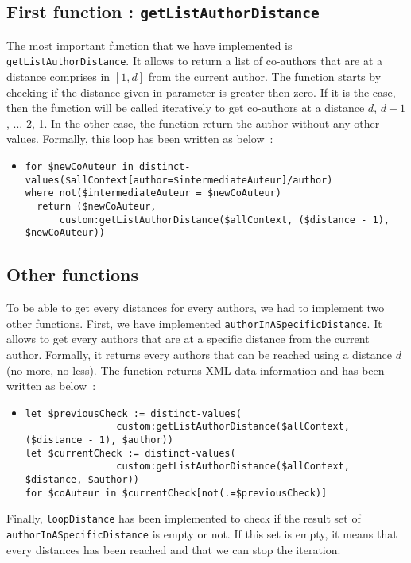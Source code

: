 \documentclass{article}
\begin{document}
  \subsection{First function : \texttt{getListAuthorDistance}}
  The most important function that we have implemented is \verb|getListAuthorDistance|. It allows to return a list of co-authors that are at a distance comprises in $[1,d]$ from the current author. The function starts by checking if the distance given in parameter is greater then zero. If it is the case, then the function will be called iteratively to get co-authors at a distance $d$, $d-1$, ... 2, 1. In the other case, the function return the author without any other values. Formally, this loop has been written as below~:
    \begin{itemize}
      \item \begin{verbatim}
for $newCoAuteur in distinct-values($allContext[author=$intermediateAuteur]/author)
where not($intermediateAuteur = $newCoAuteur)
  return ($newCoAuteur, 
      custom:getListAuthorDistance($allContext, ($distance - 1), $newCoAuteur))\end{verbatim}
    \end{itemize}
    
  \subsection{Other functions}
    To be able to get every distances for every authors, we had to implement two other functions. First, we have implemented \verb|authorInASpecificDistance|. It allows to get every authors that are at a specific distance from the current author. Formally, it returns every authors that can be reached using a distance $d$ (no more, no less). The function returns XML data information and has been written as below~:
    \begin{itemize}
      \item \begin{verbatim}
let $previousCheck := distinct-values(
                custom:getListAuthorDistance($allContext, ($distance - 1), $author))
let $currentCheck := distinct-values(
                custom:getListAuthorDistance($allContext, $distance, $author))
for $coAuteur in $currentCheck[not(.=$previousCheck)]\end{verbatim}
    \end{itemize}
    Finally, \verb|loopDistance| has been implemented to check if the result set of \verb|authorInASpecificDistance| is empty or not. If this set is empty, it means that every distances has been reached and that we can stop the iteration.
  
\end{document}
